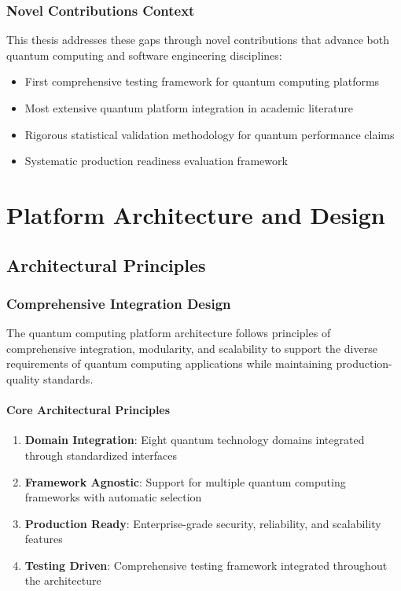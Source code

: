 \documentclass[12pt,a4paper]{report}
\begin{document}
\subsection{Novel Contributions Context}

This thesis addresses these gaps through novel contributions that advance both quantum computing and software engineering disciplines:

\begin{itemize}
\item First comprehensive testing framework for quantum computing platforms
\item Most extensive quantum platform integration in academic literature
\item Rigorous statistical validation methodology for quantum performance claims
\item Systematic production readiness evaluation framework
\end{itemize}

\chapter{Platform Architecture and Design}

\section{Architectural Principles}

\subsection{Comprehensive Integration Design}

The quantum computing platform architecture follows principles of comprehensive integration, modularity, and scalability to support the diverse requirements of quantum computing applications while maintaining production-quality standards.

\subsubsection{Core Architectural Principles}

\begin{enumerate}
\item \textbf{Domain Integration}: Eight quantum technology domains integrated through standardized interfaces
\item \textbf{Framework Agnostic}: Support for multiple quantum computing frameworks with automatic selection
\item \textbf{Production Ready}: Enterprise-grade security, reliability, and scalability features
\item \textbf{Testing Driven}: Comprehensive testing framework integrated throughout the architecture
\end{enumerate}
\end{document}
